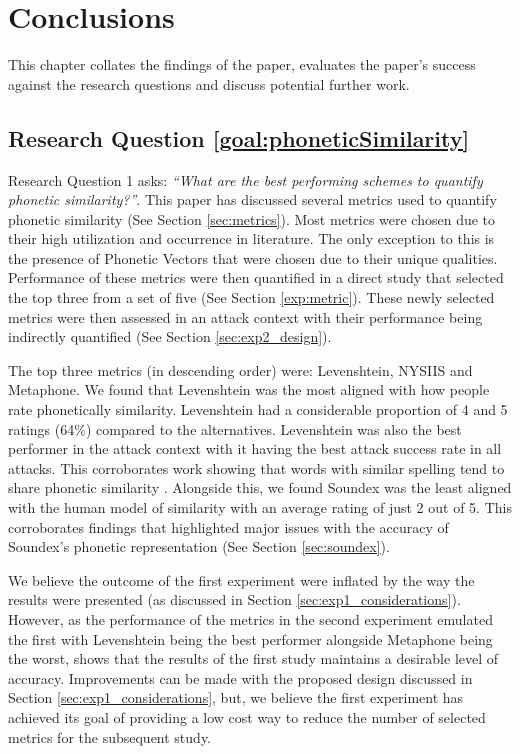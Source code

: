 \chapter{Conclusions}
This chapter collates the findings of the paper, evaluates the paper's success against the research questions and discuss potential further work.

\section{Research Question \ref{goal:phoneticSimilarity}}

Research Question 1 asks: \textit{“What are the best performing schemes to quantify phonetic similarity?”}. This paper has discussed several metrics used to quantify phonetic similarity (See Section \ref{sec:metrics}). Most metrics were chosen due to their high utilization and occurrence in literature. The only exception to this is the presence of Phonetic Vectors that were chosen due to their unique qualities. Performance of these metrics were then quantified in a direct study that selected the top three from a set of five (See Section \ref{exp:metric}). These newly selected metrics were then assessed in an attack context with their performance being indirectly quantified (See Section \ref{sec:exp2_design}).

The top three metrics (in descending order) were: Levenshtein, NYSIIS and Metaphone. We found that Levenshtein was the most aligned with how people rate phonetically similarity. Levenshtein had a considerable proportion of 4 and 5 ratings (64\%) compared to the alternatives. Levenshtein was also the best performer in the attack context with it having the best attack success rate in all attacks. This corroborates work showing that words with similar spelling tend to share phonetic similarity \cite{hettiarachchi2012sparcl}.
Alongside this, we found Soundex was the least aligned with the human model of similarity with an average rating of just 2 out of 5. This corroborates findings that highlighted major issues with the accuracy of Soundex’s phonetic representation (See Section \ref{sec:soundex}).

We believe the outcome of the first experiment were inflated by the way the results were presented (as discussed in Section \ref{sec:exp1_considerations}). However, as the performance of the metrics in the second experiment emulated the first with Levenshtein being the best performer alongside Metaphone being the worst, shows that the results of the first study maintains a desirable level of accuracy. Improvements can be made with the proposed design discussed in Section \ref{sec:exp1_considerations}, but, we believe the first experiment has achieved its goal of providing a low cost way to reduce the number of selected metrics for the subsequent study.

